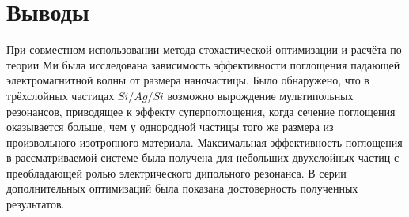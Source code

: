 \section{Выводы}

При совместном использовании метода стохастической оптимизации и
расчёта по теории Ми была исследована зависимость эффективности
поглощения падающей электромагнитной волны от размера
наночастицы. Было обнаружено, что в трёхслойных частицах $Si/Ag/Si$
возможно вырождение мультипольных резонансов, приводящее к эффекту
суперпоглощения, когда сечение поглощения оказывается больше, чем у
однородной частицы того же размера из произвольного изотропного
материала. Максимальная эффективность поглощения в рассматриваемой
системе была получена для небольших двухслойных частиц с преобладающей
ролью электрического дипольного резонанса. В серии дополнительных
оптимизаций была показана достоверность полученных результатов.

\clearpage
